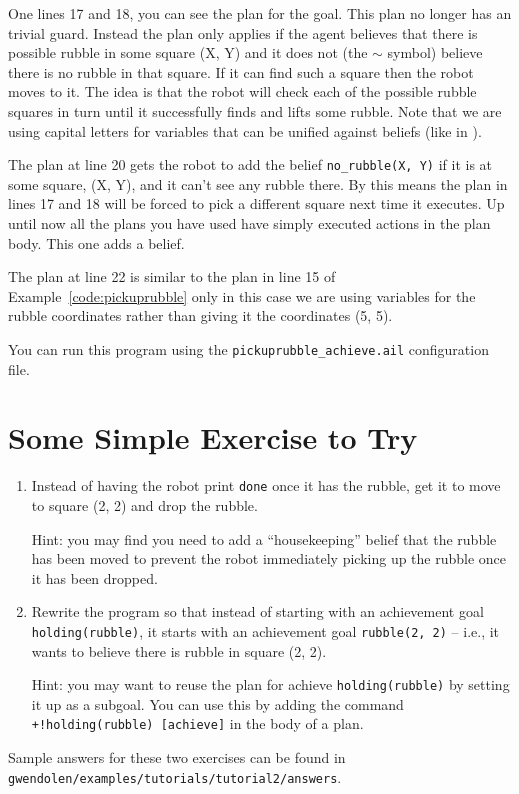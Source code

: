 One lines 17 and 18, you can see the plan for the goal.  This plan no longer has an trivial guard.  Instead the plan only applies if the agent believes that there is possible rubble in some square (X, Y) and it does not (the $\sim$ symbol) believe there is no rubble in that square.  If it can find such a square then the robot moves to it.  The idea is that the robot will check each of the possible rubble squares  in turn until it successfully finds and lifts some rubble.  Note that we are using capital letters for variables that can be unified against beliefs (like in \prolog).

The plan at line 20 gets the robot to add the belief \lstinline{no_rubble(X, Y)} if it is at some square, (X, Y), and it can't see any rubble there.  By this means the plan in lines 17 and 18 will be forced to pick a different square next time it executes.  Up until now all the plans you have used have simply executed actions in the plan body.  This one adds a belief.

The plan at line 22 is similar to the plan in line 15 of Example~\ref{code:pickuprubble} only in this case we are using variables for the rubble coordinates rather than giving it the coordinates (5, 5).

You can run this program using the \lstinline{pickuprubble_achieve.ail} configuration file.

\section{Some Simple Exercise to Try}
\begin{enumerate}
\item Instead of having the robot print \lstinline{done} once it has the rubble, get it to move to square (2, 2) and drop the rubble.  

Hint: you may find  you need to add a ``housekeeping'' belief that the rubble has been moved to prevent the robot immediately picking up the rubble once it has been dropped.
\item Rewrite the program so that instead of starting with an achievement goal \lstinline{holding(rubble)}, it starts with an achievement goal \lstinline{rubble(2, 2)} -- i.e., it wants to believe there is rubble in square (2, 2).

Hint: you may want to reuse the plan for achieve \lstinline{holding(rubble)} by setting it up as a subgoal.  You can use this by adding the command \lstinline{+!holding(rubble) [achieve]} in the body of a plan.
\end{enumerate}
\begin{sloppypar}
Sample answers for these two exercises can be found in \texttt{gwendolen/examples/tutorials/tutorial2/answers}.
\end{sloppypar}


